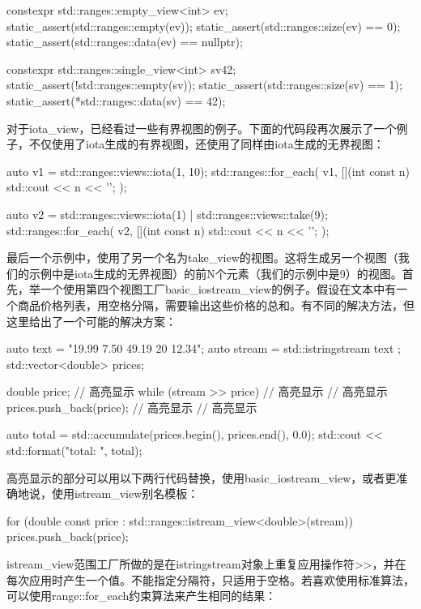 \begin{cpp}
constexpr std::ranges::empty_view<int> ev;
static_assert(std::ranges::empty(ev));
static_assert(std::ranges::size(ev) == 0);
static_assert(std::ranges::data(ev) == nullptr);

constexpr std::ranges::single_view<int> sv{42};
static_assert(!std::ranges::empty(sv));
static_assert(std::ranges::size(sv) == 1);
static_assert(*std::ranges::data(sv) == 42);
\end{cpp}

对于iota\_view，已经看过一些有界视图的例子。下面的代码段再次展示了一个例子，不仅使用了iota生成的有界视图，还使用了同样由iota生成的无界视图：

\begin{cpp}
auto v1 = std::ranges::views::iota(1, 10);
std::ranges::for_each(
	v1,
	[](int const n) {std::cout << n << '\n'; });
	
auto v2 = std::ranges::views::iota(1) |
		  std::ranges::views::take(9);
std::ranges::for_each(
	v2,
	[](int const n) {std::cout << n << '\n'; });
\end{cpp}

最后一个示例中，使用了另一个名为take\_view的视图。这将生成另一个视图（我们的示例中是iota生成的无界视图）的前N个元素（我们的示例中是9）的视图。首先，举一个使用第四个视图工厂basic\_iostream\_view的例子。假设在文本中有一个商品价格列表，用空格分隔，需要输出这些价格的总和。有不同的解决方法，但这里给出了一个可能的解决方案：

\begin{cpp}
auto text = "19.99 7.50 49.19 20 12.34";
auto stream = std::istringstream{ text };
std::vector<double> prices;

double price; // 高亮显示
while (stream >> price) // 高亮显示
{ // 高亮显示
	prices.push_back(price); // 高亮显示
} // 高亮显示

auto total = std::accumulate(prices.begin(), prices.end(),
							 0.0);
std::cout << std::format("total: {}\n", total);
\end{cpp}

高亮显示的部分可以用以下两行代码替换，使用basic\_iostream\_view，或者更准确地说，使用istream\_view别名模板：

\begin{cpp}
for (double const price :
		std::ranges::istream_view<double>(stream))
{
	prices.push_back(price);
}
\end{cpp}

istream\_view范围工厂所做的是在istringstream对象上重复应用操作符>{}>，并在每次应用时产生一个值。不能指定分隔符，只适用于空格。若喜欢使用标准算法，可以使用range::for\_each约束算法来产生相同的结果：

